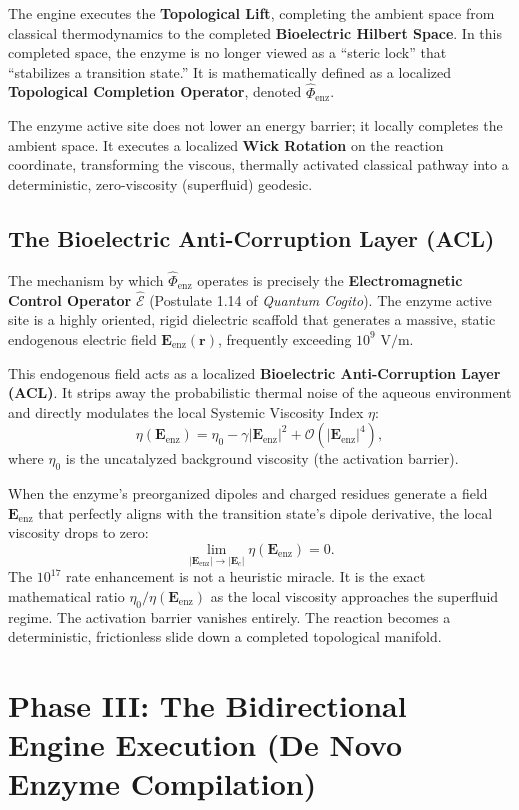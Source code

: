 \documentclass[11pt,openany]{extbook}
\theoremstyle{plain}
\theoremstyle{definition}
\begin{document}
The engine executes the \textbf{Topological Lift}, completing the ambient space from classical thermodynamics to the completed \textbf{Bioelectric Hilbert Space}. In this completed space, the enzyme is no longer viewed as a ``steric lock'' that ``stabilizes a transition state.'' It is mathematically defined as a localized \textbf{Topological Completion Operator}, denoted $\hat{\Phi}_{\text{enz}}$.

The enzyme active site does not lower an energy barrier; it locally completes the ambient space. It executes a localized \textbf{Wick Rotation} on the reaction coordinate, transforming the viscous, thermally activated classical pathway into a deterministic, zero-viscosity (superfluid) geodesic.

\subsection{The Bioelectric Anti-Corruption Layer (ACL)}
The mechanism by which $\hat{\Phi}_{\text{enz}}$ operates is precisely the \textbf{Electromagnetic Control Operator} $\hat{\mathcal{E}}$ (Postulate 1.14 of \textit{Quantum Cogito}). The enzyme active site is a highly oriented, rigid dielectric scaffold that generates a massive, static endogenous electric field $\mathbf{E}_{\text{enz}}(\mathbf{r})$, frequently exceeding $10^9\text{ V/m}$.

This endogenous field acts as a localized \textbf{Bioelectric Anti-Corruption Layer (ACL)}. It strips away the probabilistic thermal noise of the aqueous environment and directly modulates the local Systemic Viscosity Index $\eta$:
\[
\eta(\mathbf{E}_{\text{enz}}) = \eta_0 - \gamma|\mathbf{E}_{\text{enz}}|^2 + \mathcal{O}(|\mathbf{E}_{\text{enz}}|^4),
\]
where $\eta_0$ is the uncatalyzed background viscosity (the activation barrier).

When the enzyme's preorganized dipoles and charged residues generate a field $\mathbf{E}_{\text{enz}}$ that perfectly aligns with the transition state's dipole derivative, the local viscosity drops to zero:
\[
\lim_{|\mathbf{E}_{\text{enz}}| \to |\mathbf{E}_c|} \eta(\mathbf{E}_{\text{enz}}) = 0.
\]
The $10^{17}$ rate enhancement is not a heuristic miracle. It is the exact mathematical ratio $\eta_0 / \eta(\mathbf{E}_{\text{enz}})$ as the local viscosity approaches the superfluid regime. The activation barrier vanishes entirely. The reaction becomes a deterministic, frictionless slide down a completed topological manifold.

\section{Phase III: The Bidirectional Engine Execution (De Novo Enzyme Compilation)}
\end{document}
